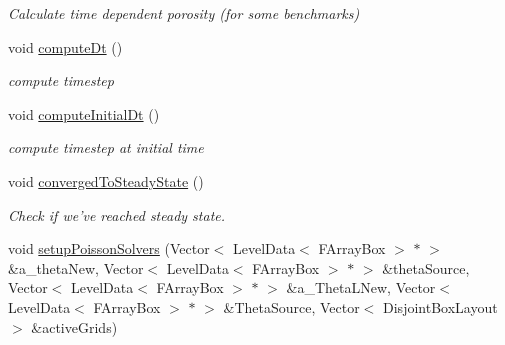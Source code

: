 \begin{DoxyCompactItemize}
\begin{DoxyCompactList}\small\item\em Calculate time dependent porosity (for some benchmarks) \end{DoxyCompactList}\item 
\hypertarget{classamr_mushy_layer_a2992090df1afaa67bc95b148716df929}{void \hyperlink{classamr_mushy_layer_a2992090df1afaa67bc95b148716df929}{compute\-Dt} ()}\label{classamr_mushy_layer_a2992090df1afaa67bc95b148716df929}

\begin{DoxyCompactList}\small\item\em compute timestep \end{DoxyCompactList}\item 
\hypertarget{classamr_mushy_layer_a8573d490c20d6f6c2e069fee72dd81b8}{void \hyperlink{classamr_mushy_layer_a8573d490c20d6f6c2e069fee72dd81b8}{compute\-Initial\-Dt} ()}\label{classamr_mushy_layer_a8573d490c20d6f6c2e069fee72dd81b8}

\begin{DoxyCompactList}\small\item\em compute timestep at initial time \end{DoxyCompactList}\item 
\hypertarget{classamr_mushy_layer_afb9fd56d615299eb57fa799c58113d3a}{void \hyperlink{classamr_mushy_layer_afb9fd56d615299eb57fa799c58113d3a}{converged\-To\-Steady\-State} ()}\label{classamr_mushy_layer_afb9fd56d615299eb57fa799c58113d3a}

\begin{DoxyCompactList}\small\item\em Check if we've reached steady state. \end{DoxyCompactList}\item 
\hypertarget{classamr_mushy_layer_a547493d383066ed91739f7132b8d0715}{void \hyperlink{classamr_mushy_layer_a547493d383066ed91739f7132b8d0715}{setup\-Poisson\-Solvers} (Vector$<$ Level\-Data$<$ F\-Array\-Box $>$ $\ast$ $>$ \&a\-\_\-theta\-New, Vector$<$ Level\-Data$<$ F\-Array\-Box $>$ $\ast$ $>$ \&theta\-Source, Vector$<$ Level\-Data$<$ F\-Array\-Box $>$ $\ast$ $>$ \&a\-\_\-\-Theta\-L\-New, Vector$<$ Level\-Data$<$ F\-Array\-Box $>$ $\ast$ $>$ \&Theta\-Source, Vector$<$ Disjoint\-Box\-Layout $>$ \&active\-Grids)}\label{classamr_mushy_layer_a547493d383066ed91739f7132b8d0715}


\end{DoxyCompactItemize}
